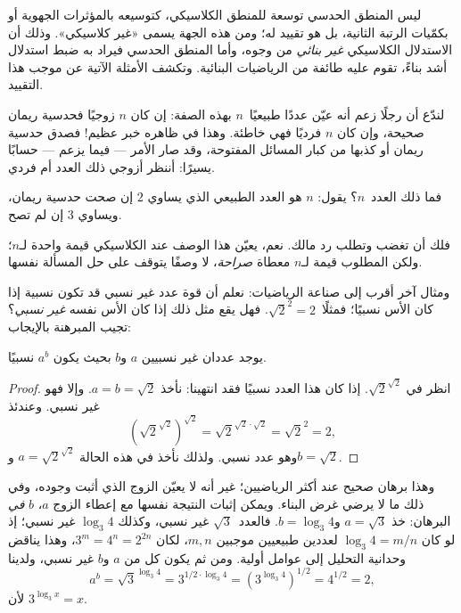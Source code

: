 \documentclass[../../../include/open-logic-section]{subfiles}
\begin{document}


ليس المنطق الحدسي توسعة للمنطق الكلاسيكي، كتوسيعه بالمؤثرات الجهوية أو
بكمّيات الرتبة الثانية، بل هو تقييد له؛ ومن هذه الجهة يسمى «غير كلاسيكي».
وذلك أن الاستدلال الكلاسيكي \emph{غير بنائي} من وجوه، وأما المنطق الحدسي
فيراد به ضبط استدلال أشد بناءً، تقوم عليه طائفة من الرياضيات البنائية.
وتكشف الأمثلة الآتية عن موجب هذا التقييد.

لندّع أن رجلًا زعم أنه عيّن عددًا طبيعيًا~$n$ بهذه الصفة: إن كان $n$
زوجيًا فحدسية ريمان صحيحة، وإن كان $n$ فرديًا فهي خاطئة. وهذا في ظاهره
خبر عظيم!{} فصدق حدسية ريمان أو كذبها من كبار المسائل المفتوحة، وقد صار
الأمر --- فيما يزعم --- حسابًا يسيرًا: أننظر أزوجي ذلك العدد أم فردي.

فما ذلك العدد~$n$؟ يقول: $n$ هو العدد الطبيعي الذي يساوي $2$ إن صحت
حدسية ريمان، ويساوي $3$ إن لم تصح.

فلك أن تغضب وتطلب رد مالك. نعم، يعيّن هذا الوصف عند الكلاسيكي قيمة واحدة
لـ$n$؛ ولكن المطلوب قيمة لـ$n$ معطاة \emph{صراحة}، لا وصفًا يتوقف على
حل المسألة نفسها.

ومثال آخر أقرب إلى صناعة الرياضيات: نعلم أن قوة عدد غير نسبي قد تكون
نسبية إذا كان الأس نسبيًا؛ فمثلًا~$\sqrt{2}^2 = 2$. فهل يقع مثل ذلك إذا
كان الأس نفسه \emph{غير نسبي}؟ تجيب المبرهنة بالإيجاب:

\begin{thm}
يوجد عددان غير نسبيين $a$ و$b$ بحيث يكون $a^b$ نسبيًا.
\end{thm}

\begin{proof}
انظر في $\sqrt{2}^{\sqrt{2}}$. إذا كان هذا العدد نسبيًا فقد انتهينا:
نأخذ $a = b = \sqrt{2}$. وإلا فهو غير نسبي. وعندئذ
\[
(\sqrt{2}^{\sqrt{2}})^{\sqrt{2}} = \sqrt{2}^{\sqrt{2} \cdot
  \sqrt{2}} = \sqrt{2}^2 = 2,
\]
وهو عدد نسبي. ولذلك نأخذ في هذه الحالة
$a=\sqrt{2}^{\sqrt{2}}$ و$b=\sqrt 2$.
\end{proof}

وهذا برهان صحيح عند أكثر الرياضيين؛ غير أنه لا يعيّن الزوج الذي أثبت
وجوده، وفي ذلك ما لا يرضي غرض البناء. ويمكن إثبات النتيجة نفسها مع إعطاء
الزوج $a$، $b$ \emph{في} البرهان: خذ
$a = \sqrt{3}$ و$b = \log_3 4$. فالعدد~$\sqrt3$ غير نسبي، وكذلك
$\log_3 4$ غير نسبي؛ إذ لو كان $\log_3 4=m/n$ لعددين طبيعيين موجبين
$m,n$، لكان $3^m=4^n=2^{2n}$، وهذا يناقض وحدانية التحليل إلى عوامل
أولية. ومن ثم يكون كل من $a$ و$b$ غير نسبي، ولدينا
\[
a^b = \sqrt{3}^{\log_3 4} = 3^{1/2 \cdot \log_3 4} = (3^{\log_3
  4})^{1/2} = 4^{1/2}= 2,
\]
لأن $3^{\log_3 x} = x$.
\end{document}
